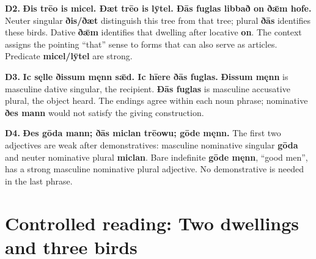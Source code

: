 \par\begin{minipage}{\linewidth}\raggedright
\textbf{D2.} \textbf{Ðis trēo is micel. Ðæt trēo is lȳtel. Ðās fuglas libbað on ðǣm hofe.} Neuter singular \textbf{ðis/\allowbreak{}ðæt} distinguish this tree from that tree; plural \textbf{ðās} identifies these birds. Dative \textbf{ðǣm} identifies that dwelling after locative \textbf{on}. The context assigns the pointing “that” sense to forms that can also serve as articles. Predicate \textbf{micel/\allowbreak{}lȳtel} are strong.

\end{minipage}\par\addvspace{4pt}

\par\begin{minipage}{\linewidth}\raggedright
\textbf{D3.} \textbf{Ic sęlle ðissum męnn sǣd. Ic hīere ðās fuglas.} \textbf{Ðissum męnn} is masculine dative singular, the recipient. \textbf{Ðās fuglas} is masculine accusative plural, the object heard. The endings agree within each noun phrase; nominative \textbf{ðes mann} would not satisfy the giving construction.

\end{minipage}\par\addvspace{4pt}

\par\begin{minipage}{\linewidth}\raggedright
\textbf{D4.} \textbf{Ðes gōda mann; ðās miclan trēowu; gōde męnn.} The first two adjectives are weak after demonstratives: masculine nominative singular \textbf{gōda} and neuter nominative plural \textbf{miclan}. Bare indefinite \textbf{gōde męnn}, “good men”, has a strong masculine nominative plural adjective. No demonstrative is needed in the last phrase.

\end{minipage}\par\addvspace{4pt}

\section*{Controlled reading: Two dwellings and three birds}

